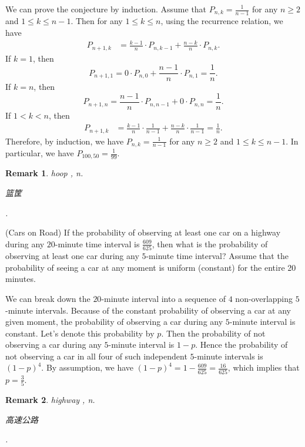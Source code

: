 \documentclass[12pt,letterpaper, onecolumn]{exam}
\newtheorem{remark}{Remark}
\begin{document}
\begin{questions}
\begin{solution}
    \quad We can prove the conjecture by induction. Assume that $P_{n,k}=\frac{1}{n-1}$ for any $n\ge 2$ and $1\le k\le n-1$. Then for any $1\le k\le n$, using the recurrence relation, we have
    \begin{align*}
        P_{n+1,k}&=\frac{k-1}{n}\cdot P_{n,k-1}+\frac{n-k}{n}\cdot P_{n,k}.
    \end{align*}
    If $k=1$, then 
    $$P_{n+1,1}=0\cdot P_{n,0}+\frac{n-1}{n}\cdot P_{n,1}=\frac{1}{n}.$$
    If $k=n$, then 
    $$P_{n+1,n}=\frac{n-1}{n}\cdot P_{n,n-1}+0\cdot P_{n,n}=\frac{1}{n}.$$
    If $1<k<n$, then 
    \begin{align*}
        P_{n+1,k}&=\frac{k-1}{n}\cdot\frac{1}{n-1}+\frac{n-k}{n}\cdot\frac{1}{n-1}=\frac{1}{n}.
    \end{align*}
    Therefore, by induction, we have $P_{n,k}=\frac{1}{n-1}$ for any $n\ge 2$ and $1\le k\le n-1$. In particular, we have $P_{100,50}=\frac{1}{99}$.
\end{solution}
\begin{remark}
    hoop , n. \begin{CJK}{UTF8}{gbsn}篮筐\end{CJK}.
\end{remark}

\question[](Cars on Road) If the probability of observing at least one car on a highway during any $20$-minute time interval is $\frac{609}{625}$, then what is the probability of observing at least one car during any $5$-minute time interval? Assume that the probability of seeing a car at any moment is uniform (constant) for the entire 20 minutes.
\begin{solution}
    We can break down the $20$-minute interval into a sequence of $4$ non-overlapping $5$-minute intervals. Because of the constant probability of observing a car at any given moment, the probability of observing a car during any $5$-minute interval is constant. Let's denote this probability by $p$. Then the probability of not observing a car during any $5$-minute interval is $1-p$. Hence the probability of not observing a car in all four of such independent $5$-minute intervals is $(1-p)^4$. By assumption, we have $(1-p)^4=1-\frac{609}{625}=\frac{16}{625}$, which implies that $p=\frac{3}{5}$.
\end{solution}
\begin{remark}
    highway , n. \begin{CJK}{UTF8}{gbsn}高速公路\end{CJK}.
\end{remark}
\end{questions}
\end{document}
